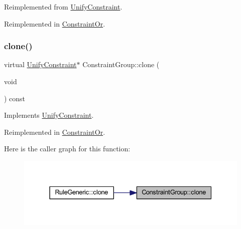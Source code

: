 Reimplemented from \mbox{\hyperlink{class_unify_constraint_a5e1db6cd9dc1c2c22f6a98d5c1556e41}{Unify\+Constraint}}.



Reimplemented in \mbox{\hyperlink{class_constraint_or_a009ca281642d6e7949ee4b997f82e3df}{Constraint\+Or}}.

\mbox{\label{class_constraint_group_a7121c0ef41bb59e28305e5ddb3c80f35}} 
\subsubsection{\texorpdfstring{clone()}{clone()}}
{\footnotesize\ttfamily virtual \mbox{\hyperlink{class_unify_constraint}{Unify\+Constraint}}$\ast$ Constraint\+Group\+::clone (\begin{DoxyParamCaption}\item[{void}]{ }\end{DoxyParamCaption}) const\hspace{0.3cm}{\ttfamily [virtual]}}



Implements \mbox{\hyperlink{class_unify_constraint_a4f068343932637d355644bb21559aa12}{Unify\+Constraint}}.



Reimplemented in \mbox{\hyperlink{class_constraint_or_ab5e39153f8f49fe816667d0f63848dbf}{Constraint\+Or}}.

Here is the caller graph for this function\+:
\nopagebreak
\begin{figure}[H]
\begin{center}
\leavevmode
\includegraphics[width=331pt]{class_constraint_group_a7121c0ef41bb59e28305e5ddb3c80f35_icgraph}
\end{center}
\end{figure}
\mbox{\label{class_constraint_group_ac1b507b8c2e1f0f458fdaa474fc58bc1}} 
